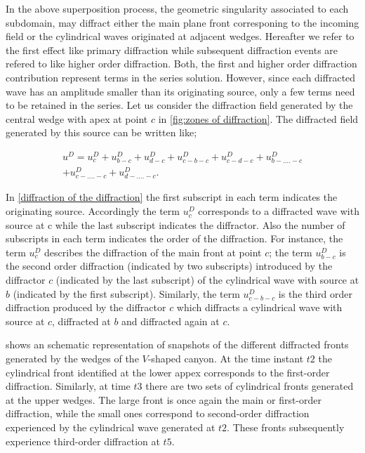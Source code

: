\documentclass[11pt,letterpaper]{article}
\begin{document}
In the above superposition process, the geometric singularity associated to each subdomain, may diffract either the main plane front corresponing to the incoming field or the cylindrical waves originated at adjacent wedges. Hereafter we refer to the first effect like primary diffraction while subsequent diffraction events are refered to like higher order diffraction. Both, the first and higher order diffraction contribution represent terms in the series solution. However, since each diffracted wave has an amplitude smaller than its originating source, only a few terms need to be retained in the series. Let us consider the diffraction field generated by the central wedge with apex at point $c$ in \cref{fig:zones of diffraction}. The diffracted field generated by this source can be written like;

\begin{multline}
u^D=u^D_c+u^D_{b-c}+u^D_{d-c}+u^D_{c-b-c}+u^D_{c-d-c}+u^D_{b-....-c}\\
+u^D_{c-....-c}+u^D_{d-....-c}. 
\label{diffraction of the diffraction}
\end{multline}

In \cref{diffraction of the diffraction} the first subscript in each term indicates the originating source. Accordingly the term $u^D_c$ corresponds to a diffracted wave with source at c while the last subscript indicates the diffractor. Also the number of subscripts in each term indicates the order of the diffraction. For instance, the term $u^D_c$ describes the diffraction of the main front at point $c$; the term $u^D_{b-c}$ is the second order diffraction (indicated by two subscripts) introduced by the diffractor $c$ (indicated by the last subscript) of the cylindrical wave with source at $b$ (indicated by the first subscript). Similarly, the term $u^D_{c-b-c}$ is the third order diffraction produced by the diffractor $c$ which diffracts a cylindrical wave with source at $c$, diffracted at $b$ and diffracted again at $c$.

 shows an schematic representation of snapshots of the different diffracted fronts generated by the wedges of the $V$-shaped canyon. At the time instant $t2$ the cylindrical front identified at the lower appex corresponds to the first-order diffraction. Similarly, at time $t3$ there are two sets of cylindrical fronts generated at the upper wedges. The large front is once again the main or first-order diffraction, while the small ones correspond to second-order diffraction experienced by the cylindrical wave generated at $t2$. These fronts subsequently experience third-order diffraction at $t5$.
\end{document}
